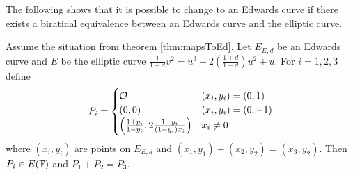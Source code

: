 The following shows that it is possible to change to an Edwards curve if there exists a biratinal equivalence between an Edwards curve and the elliptic curve. 
\begin{thm}\label{thm:EdCcorrespondEC}
Assume the situation from theorem \ref{thm:mapsToEd}. Let $E_{E,d}$ be an Edwards curve and $E$ be the elliptic curve $\frac{1}{1-d}v^2=u^3+2\left(\frac{1+d}{1-d}\right)u^2+u$. For $i=1,2,3$ define
\begin{align}\label{assignments}
P_i = \begin{cases}
	\mathcal{O} & (x_i,y_i)=(0,1) \\
	(0,0) & (x_i,y_i)=(0,-1) \\
	\left(\frac{1+y_i}{1-y_i},2\frac{1+y_i}{(1-y_i)x_i}\right) & x_i\neq 0
\end{cases}
\end{align}
where $(x_i,y_i)$ are points on $E_{E,d}$ and $(x_1,y_1)+(x_2,y_2)=(x_3,y_2)$. Then $P_i\in E(\mathbb{F})$ and $P_1+P_2=P_3$. 
\end{thm} 
